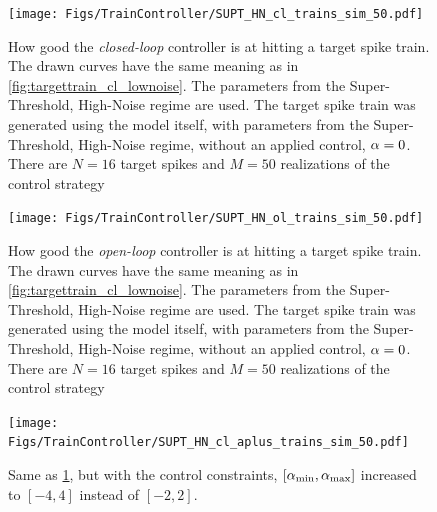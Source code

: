 \begin{figure}[htp] 
\begin{center} 
  \texttt{[image: Figs/TrainController/SUPT\_HN\_cl\_trains\_sim\_50.pdf]} 
  \caption[ ]{How good the {\sl closed-loop} controller is at hitting a target 
  spike train.  
  The drawn curves have  the same meaning as in 
  \cref{fig:targettrain_cl_lownoise}. 
  The parameters from the Super-Threshold, High-Noise regime 
  are used. The target spike train was generated using the model itself, with 
  parameters from the Super-Threshold, High-Noise regime, without an applied 
  control, ${\alpha}=0$. 
  There are $N=16$ target spikes and $M=50$ realizations of the control strategy} 
  \label{fig:targettrain_cl_highnoise} 
\end{center}  
\end{figure} 
\begin{figure}[htp] 
\begin{center} 
  \texttt{[image: Figs/TrainController/SUPT\_HN\_ol\_trains\_sim\_50.pdf]} 
  \caption[]{How good the {\sl open-loop} controller is at hitting a target 
  spike train.  
  The drawn curves have  the same meaning as in 
  \cref{fig:targettrain_cl_lownoise}. 
  The parameters from the Super-Threshold, High-Noise regime 
  are used. The target spike train was generated using the model itself, with 
  parameters from the Super-Threshold, High-Noise regime, without an applied 
  control, ${\alpha}=0$. 
  There are $N=16$ target spikes and $M=50$ realizations of the control strategy} 
  \label{fig:targettrain_ol_highnoise}     
\end{center} 
\end{figure} 
\begin{figure}[htp] 
\begin{center} 
  \texttt{[image: Figs/TrainController/SUPT\_HN\_cl\_aplus\_trains\_sim\_50.pdf]} 
  \caption[ ]{Same as \cref{fig:targettrain_cl_highnoise}, but with the control 
  constraints, $[{ {\alpha}_{\textrm{min}} }, { {\alpha}_{\textrm{max}} }]$ increased to $[-4,4]$ instead of $[-2,2]$.} 
  \label{fig:targettrain_cl_highnoise_aplus}     
\end{center} 
\end{figure}  
